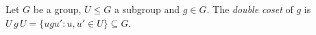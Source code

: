 Let $G$ be a group, $U\le G$ a subgroup and $g\in G$. The \emph{double coset} of $g$ is $U\,g\,U=\{ugu':u,u'\in U\}\subseteq G$.
